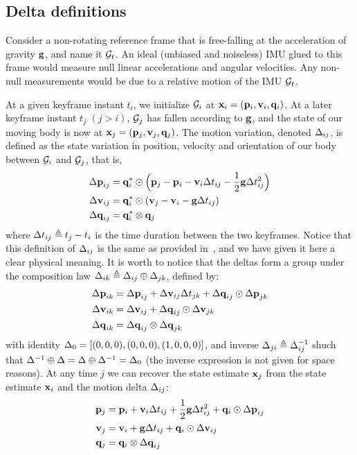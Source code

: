 \subsection{Delta definitions}

Consider a non-rotating reference frame that is free-falling at the acceleration of gravity ${\bf g}$, and name it $\mathcal{G}_t$. 
An ideal (unbiased and noiseless) IMU glued to this frame would measure null linear accelerations and angular velocities. 
Any non-null measurements would be due to a relative motion of the IMU \wrt  $\mathcal{G}_t$.

At a given keyframe instant $t_i$, we initialize $\mathcal{G}_i$ at \mbox{${\bf x}_i=({\bf p}_i,{\bf v}_i,{\bf q}_i)$}.
At a later keyframe instant $t_j$ $(j > i)$,  $\mathcal{G}_j$ has fallen according to ${\bf g}$, and the state of our moving body is now at ${\bf x}_j=({\bf p}_j,{\bf v}_j,{\bf q}_j)$.
The motion variation, denoted $\Delta_{ij}$, is defined as the state variation in position, velocity and orientation of our body between $\mathcal{G}_i$ and  $\mathcal{G}_j$, that is,
%
\begin{align}\label{equ:delta_definition}
\begin{split}
{\Delta{\bf p}}_{ij} &= {\bf q}_i^*\odot\Big({\bf p}_j - {\bf p}_i - {\bf v}_i\Delta t_{ij} - \frac12{\bf g}\Delta t_{ij}^2\Big) \\
{\Delta{\bf v}}_{ij} &= {\bf q}_i^*\odot({\bf v}_j - {\bf v}_i - {\bf g}\Delta t_{ij}) \\
{\Delta{\bf q}}_{ij} &= {\bf q}_i^*\otimes{\bf q}_j 
\end{split}
\end{align}
%
where $\Delta t_{ij} \triangleq t_j - t_i$ is the time duration between the two keyframes. 
Notice that this definition of $\Delta_{ij}$ is the same as provided in~\cite{LUPTON-09,forster2015imu}, and we have given it here a clear physical meaning.
It is worth to notice that the deltas form a group under the composition law $\Delta_{ik}\triangleq\Delta_{ij}\oplus\Delta_{jk}$, defined by:
%
\begin{align} \label{equ:composition}
\begin{split}
{\Delta{\bf p}}_{ik} 
&= {\Delta{\bf p}}_{ij} + {\Delta{\bf v}}_{ij}\Delta t_{jk} + {\Delta{\bf q}}_{ij}\odot{\Delta{\bf p}}_{jk} \\
{\Delta{\bf v}}_{ik} 
&= {\Delta{\bf v}}_{ij} + {\Delta{\bf q}}_{ij}\odot{\Delta{\bf v}}_{jk} \\
{\Delta{\bf q}}_{ik} 
&= {\Delta{\bf q}}_{ij}\otimes{\Delta{\bf q}}_{jk} 
\end{split}
\end{align}
%
with identity $\Delta_0=[(0,0,0),(0,0,0),(1,0,0,0)]$, and inverse $\Delta_{ji}\triangleq\Delta_{ij}^{-1}$ shuch that $\Delta^{-1}\oplus\Delta=\Delta\oplus\Delta^{-1}=\Delta_0$ (the inverse expression is not given for space reasons).
At any time $j$ we can recover the state estimate ${\bf x}_j$ from the state estimate ${\bf x}_i$ and the motion delta $\Delta_{ij}$:
%
\begin{align} \label{equ:reconstruction}
\begin{split}
{\bf p}_j &= {\bf p}_i + {\bf v}_i\Delta t_{ij} + \frac12{\bf g}\Delta t_{ij}^2 + {\bf q}_i\odot{\Delta{\bf p}}_{ij} \\
{\bf v}_j &= {\bf v}_i + {\bf g}\Delta t_{ij} + {\bf q}_i\odot{\Delta{\bf v}}_{ij} \\
{\bf q}_j &= {\bf q}_i\otimes{\Delta{\bf q}}_{ij}   
\end{split}
\end{align}

